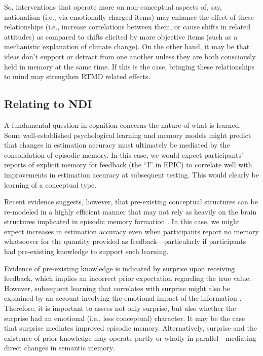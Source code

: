 So, interventions that operate more on non-conceptual aspects of, say,
nationalism (i.e., via emotionally charged items) may enhance the effect of
these relationships (i.e., increase correlations between them, or cause shifts in
related attitudes) as compared to shifts elicited by more objective items (such
as a mechanistic explanation of climate change).  On the other hand, it may be
that ideas don't support or detract from one another unless they are both
consciously held in memory at the same time. If this is the case, bringing these
relationships to mind may strengthen RTMD related effects.

\subsection{Relating to NDI}

A fundamental question in cognition concerns the nature of what is learned. Some
well-established psychological learning and memory models
\cite{nadel_memory_1997} might predict that changes in estimation accuracy must
ultimately be mediated by the consolidation of episodic memory. In this case, we
would expect participants' reports of explicit memory for feedback (the ``I'' in
EPIC) to correlate well with improvements in estimation accuracy at subsequent
testing.  This would clearly be learning of a conceptual type.

Recent evidence suggests, however, that pre-existing conceptual structures can
be re-modeled in a highly efficient manner that may not rely as heavily on the
brain structures implicated in episodic memory formation
\cite{tse_schemas_2007,clark_assembling_2003}. In this case, we might expect
increases in estimation accuracy even when participants report no memory
whatsoever for the quantity provided as feedback---particularly if participants
had pre-existing knowledge to support such learning.

Evidence of pre-existing knowledge is indicated by surprise upon receiving
feedback, which implies an incorrect prior expectation regarding the true value.
However, subsequent learning that correlates with surprise might also be
explained by an account involving the emotional impact of the information
\cite{munnich_surprise_2007,thagard_hot_2006}.  Therefore, it is important to
assess not only surprise, but also whether the surprise had an emotional (i.e.,
less conceptual) character. It may be the case that surprise mediates improved
episodic memory. Alternatively, surprise and the existence of prior knowledge
may operate partly or wholly in parallel---mediating direct changes in semantic
memory.

